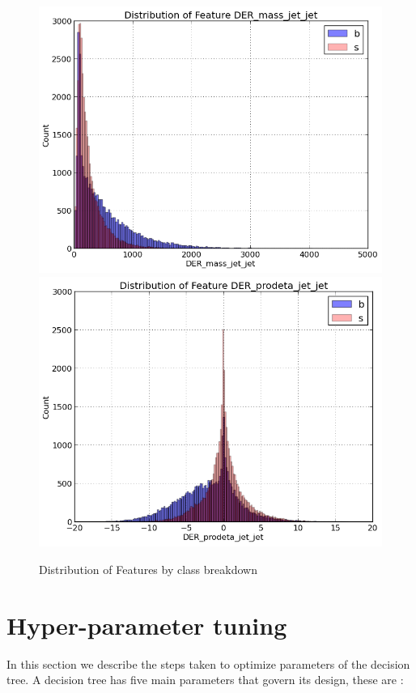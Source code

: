 \documentclass[final,3p,times,twocolumn]{elsarticle}
\begin{document}
\begin{figure}
\hspace{-0.5cm}
\includegraphics[scale=0.5]{Images/DER_mass_jet_jet_Hist.png}
\hspace{4mm}
\includegraphics[scale=0.5]{Images/DER_prodeta_jet_jet_Hist.png}
\caption{Distribution of Features by class breakdown}
\label{dists_2}
\end{figure}



\section{Hyper-parameter tuning}
In this section we describe the steps taken to optimize parameters of the decision tree. A decision tree has five main parameters that govern its design, these are :
\end{document}
